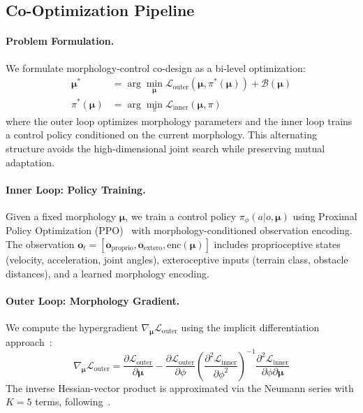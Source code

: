 \subsection{Co-Optimization Pipeline}
\label{sec:coopt}

\paragraph{Problem Formulation.}
We formulate morphology-control co-design as a bi-level optimization:
\begin{align}
    \boldsymbol{\mu}^* &= \arg\min_{\boldsymbol{\mu}} \mathcal{L}_\text{outer}(\boldsymbol{\mu}, \pi^*(\boldsymbol{\mu})) + \mathcal{B}(\boldsymbol{\mu}) \label{eq:outer} \\
    \pi^*(\boldsymbol{\mu}) &= \arg\min_{\pi} \mathcal{L}_\text{inner}(\boldsymbol{\mu}, \pi) \label{eq:inner}
\end{align}
where the outer loop optimizes morphology parameters and the inner loop trains a control policy conditioned on the current morphology. This alternating structure avoids the high-dimensional joint search while preserving mutual adaptation.

\paragraph{Inner Loop: Policy Training.}
Given a fixed morphology $\boldsymbol{\mu}$, we train a control policy $\pi_\phi(a | o, \boldsymbol{\mu})$ using Proximal Policy Optimization (PPO)~\citep{schulman2017ppo} with morphology-conditioned observation encoding. The observation $\mathbf{o}_t = [\mathbf{o}_\text{proprio}, \mathbf{o}_\text{extero}, \text{enc}(\boldsymbol{\mu})]$ includes proprioceptive states (velocity, acceleration, joint angles), exteroceptive inputs (terrain class, obstacle distances), and a learned morphology encoding.

\paragraph{Outer Loop: Morphology Gradient.}
We compute the hypergradient $\nabla_{\boldsymbol{\mu}} \mathcal{L}_\text{outer}$ using the implicit differentiation approach~\citep{lorraine2020optimizing}:
\begin{equation}
    \nabla_{\boldsymbol{\mu}} \mathcal{L}_\text{outer} = \frac{\partial \mathcal{L}_\text{outer}}{\partial \boldsymbol{\mu}} - \frac{\partial \mathcal{L}_\text{outer}}{\partial \phi} \left( \frac{\partial^2 \mathcal{L}_\text{inner}}{\partial \phi^2} \right)^{-1} \frac{\partial^2 \mathcal{L}_\text{inner}}{\partial \phi \partial \boldsymbol{\mu}}
    \label{eq:hypergrad}
\end{equation}
The inverse Hessian-vector product is approximated via the Neumann series with $K=5$ terms, following~\citep{lorraine2020optimizing}.

